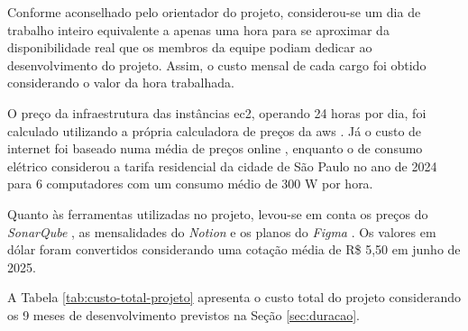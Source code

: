 Conforme aconselhado pelo orientador do projeto, considerou-se um dia de trabalho inteiro equivalente a apenas uma hora para se aproximar da disponibilidade real que os membros da equipe podiam dedicar ao desenvolvimento do projeto. Assim, o custo mensal de cada cargo foi obtido considerando o valor da hora trabalhada.

O preço da infraestrutura das instâncias \gls{ec2}, operando 24 horas por dia, foi calculado utilizando a própria calculadora de preços da \gls{aws} \cite{aws-calculadora-2025}. Já o custo de internet foi baseado numa média de preços online \cite{internet-precos-2025}, enquanto o de consumo elétrico considerou a tarifa residencial da cidade de São Paulo no ano de 2024 \cite{enel-tarifa-2024} para 6 computadores com um consumo médio de 300 W por hora.

Quanto às ferramentas utilizadas no projeto, levou-se em conta os preços do \emph{SonarQube} \cite{sonarqube-preco-2025}, as mensalidades do \emph{Notion} \cite{notion-preco-2025} e os planos do \emph{Figma} \cite{figma-preco-2025}. Os valores em dólar foram convertidos considerando uma cotação média de R\$ 5,50 em junho de 2025.

A Tabela \ref{tab:custo-total-projeto} apresenta o custo total do projeto considerando os 9 meses de desenvolvimento previstos na Seção \ref{sec:duracao}.

